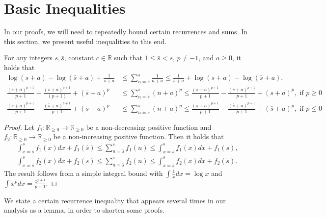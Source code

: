 
\section{Basic Inequalities}\label{app:basic_inequalities}

In our proofs, we will need to repeatedly bound certain recurrences and sums.
In this section, we present useful inequalities to this end.

\begin{lemma}\label{lemma:harmonic}
For any integers $s,\bar{s}$, constant $c\in\mathbb{R}$ such that $1 \leq \bar{s} < s$, $p \neq -1$, and $a \geq 0$, it holds that
\begin{align*}
   \log (s + a) - \log (\bar{s} + a ) + \frac{1}{s + a} &\leq \sum_{n = \bar{s}}^{s} \frac{1}{n + a} \leq \frac{1}{\bar{s} + a} + \log ( s + a) - \log (\bar{s} + a), \\
   \frac{(s + a)^{p+1}}{p+1} - \frac{(\bar{s} + a)^{p+1}}{(p+1)} + (\bar{s} + a)^p &\leq \sum_{n = \bar{s}}^{s} (n + a)^p \leq \frac{(s + a)^{p+1}}{p+1} - \frac{(\bar{s} + a)^{p+1}}{p+1} + (s + a)^p, \text{ if } p \geq 0 \\
   \frac{(s + a)^{p+1}}{p+1} - \frac{(\bar{s} + a)^{p+1}}{p+1} + (s + a)^p &\leq \sum_{n = \bar{s}}^{s} (n + a)^p \leq \frac{(s + a)^{p+1}}{p+1} - \frac{(\bar{s} + a)^{p+1}}{p+1} + (\bar{s} + a)^p, \text{ if } p \leq 0
\end{align*}
\end{lemma}
\begin{proof}
Let $f_1:\mathbb{R}_{\geq 0} \rightarrow \mathbb{R}_{\geq 0}$ be a non-decreasing positive function and $f_2:\mathbb{R}_{\geq 0} \rightarrow \mathbb{R}_{\geq 0}$ be a non-increasing positive function.
Then it holds that
\begin{align*}
    \int_{x = \bar{s}}^s f_1(x) dx + f_1(\bar{s}) \leq \sum_{n=\bar{s}}^s f_1(n) \leq \int_{x = \bar{s}}^s f_1(x) dx  + f_1(s), \\
    \int_{x = \bar{s}}^s f_2(x) dx + f_2(s) \leq \sum_{n=\bar{s}}^s f_2(n) \leq \int_{x = \bar{s}}^s f_2(x) dx + f_2(\bar{s}).
\end{align*}
The result follows from a simple integral bound with $\int \frac{1}{x} dx = \log x$ and $\int x^p dx = \frac{x^{p+1}}{p+1}$.
\end{proof}

We state a certain recurrence inequality that appears several times in our analysis as a lemma, in order to shorten some proofs.

